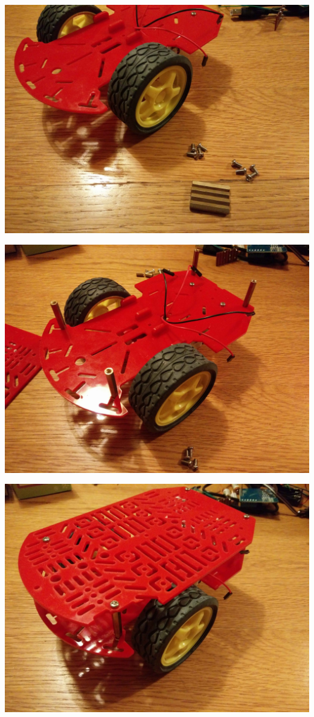 \documentclass[]{bilingualworkshop}
\begin{document}
    \includegraphics[width=15cm]{img/13.jpg}\par
    \includegraphics[width=15cm]{img/14.jpg}\par
    \includegraphics[width=15cm]{img/15.jpg}

    
\end{document}
